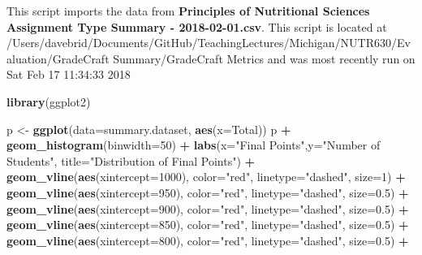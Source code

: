 \documentclass[]{article}
\newenvironment{Shaded}{\begin{snugshade}}{\end{snugshade}}
\newcommand{\KeywordTok}[1]{\textcolor[rgb]{0.13,0.29,0.53}{\textbf{#1}}}
\newcommand{\DataTypeTok}[1]{\textcolor[rgb]{0.13,0.29,0.53}{#1}}
\newcommand{\DecValTok}[1]{\textcolor[rgb]{0.00,0.00,0.81}{#1}}
\newcommand{\FloatTok}[1]{\textcolor[rgb]{0.00,0.00,0.81}{#1}}
\newcommand{\StringTok}[1]{\textcolor[rgb]{0.31,0.60,0.02}{#1}}
\newcommand{\OperatorTok}[1]{\textcolor[rgb]{0.81,0.36,0.00}{\textbf{#1}}}
\newcommand{\NormalTok}[1]{#1}
\begin{document}
This script imports the data from \textbf{Principles of Nutritional
Sciences Assignment Type Summary - 2018-02-01.csv}. This script is
located at
/Users/davebrid/Documents/GitHub/TeachingLectures/Michigan/NUTR630/Evaluation/GradeCraft
Summary/GradeCraft Metrics and was most recently run on Sat Feb 17
11:34:33 2018

\begin{Shaded}
\begin{Highlighting}[]
\KeywordTok{library}\NormalTok{(ggplot2)}

\NormalTok{p <-}\StringTok{ }\KeywordTok{ggplot}\NormalTok{(}\DataTypeTok{data=}\NormalTok{summary.dataset, }\KeywordTok{aes}\NormalTok{(}\DataTypeTok{x=}\NormalTok{Total)) }
\NormalTok{p }\OperatorTok{+}\StringTok{ }\KeywordTok{geom_histogram}\NormalTok{(}\DataTypeTok{binwidth=}\DecValTok{50}\NormalTok{) }\OperatorTok{+}
\StringTok{  }\KeywordTok{labs}\NormalTok{(}\DataTypeTok{x=}\StringTok{"Final Points"}\NormalTok{,}\DataTypeTok{y=}\StringTok{"Number of Students"}\NormalTok{, }\DataTypeTok{title=}\StringTok{"Distribution of Final Points"}\NormalTok{) }\OperatorTok{+}
\StringTok{  }\KeywordTok{geom_vline}\NormalTok{(}\KeywordTok{aes}\NormalTok{(}\DataTypeTok{xintercept=}\DecValTok{1000}\NormalTok{), }\DataTypeTok{color=}\StringTok{"red"}\NormalTok{, }\DataTypeTok{linetype=}\StringTok{"dashed"}\NormalTok{, }\DataTypeTok{size=}\DecValTok{1}\NormalTok{) }\OperatorTok{+}
\StringTok{  }\KeywordTok{geom_vline}\NormalTok{(}\KeywordTok{aes}\NormalTok{(}\DataTypeTok{xintercept=}\DecValTok{950}\NormalTok{), }\DataTypeTok{color=}\StringTok{"red"}\NormalTok{, }\DataTypeTok{linetype=}\StringTok{"dashed"}\NormalTok{, }\DataTypeTok{size=}\FloatTok{0.5}\NormalTok{) }\OperatorTok{+}
\StringTok{  }\KeywordTok{geom_vline}\NormalTok{(}\KeywordTok{aes}\NormalTok{(}\DataTypeTok{xintercept=}\DecValTok{900}\NormalTok{), }\DataTypeTok{color=}\StringTok{"red"}\NormalTok{, }\DataTypeTok{linetype=}\StringTok{"dashed"}\NormalTok{, }\DataTypeTok{size=}\FloatTok{0.5}\NormalTok{) }\OperatorTok{+}
\StringTok{  }\KeywordTok{geom_vline}\NormalTok{(}\KeywordTok{aes}\NormalTok{(}\DataTypeTok{xintercept=}\DecValTok{850}\NormalTok{), }\DataTypeTok{color=}\StringTok{"red"}\NormalTok{, }\DataTypeTok{linetype=}\StringTok{"dashed"}\NormalTok{, }\DataTypeTok{size=}\FloatTok{0.5}\NormalTok{) }\OperatorTok{+}
\StringTok{  }\KeywordTok{geom_vline}\NormalTok{(}\KeywordTok{aes}\NormalTok{(}\DataTypeTok{xintercept=}\DecValTok{800}\NormalTok{), }\DataTypeTok{color=}\StringTok{"red"}\NormalTok{, }\DataTypeTok{linetype=}\StringTok{"dashed"}\NormalTok{, }\DataTypeTok{size=}\FloatTok{0.5}\NormalTok{) }\OperatorTok{+}

\end{Highlighting}
\end{Shaded}
\end{document}
